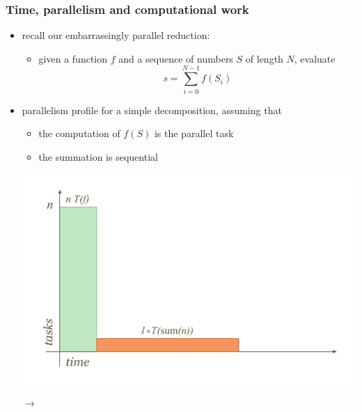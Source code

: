 %
%
%
%


\begin{frame}[fragile]
%
  \frametitle{Time, parallelism and computational work}
%
  \begin{itemize}
  \item recall our embarrassingly parallel reduction: 
    \begin{itemize}
    \item given a function $f$ and a sequence of numbers $S$ of length $N$, evaluate
    \[
    s = \sum_{i=0}^{N-1}f(S_{i})
    \]
    \end{itemize}
%
  \item parallelism profile for a simple decomposition, assuming that
    \begin{itemize}
    \item the computation of $f(S)$ is the parallel task
    \item the summation is sequential
    \end{itemize}
%
    \begin{minipage}{.45\linewidth}
      \includegraphics[scale=0.6]{figures/reduction-parallel-work.pdf}
    \end{minipage}
    $\longrightarrow$
    \begin{minipage}{.45\linewidth}

\end{minipage}
\end{itemize}
\end{frame}
